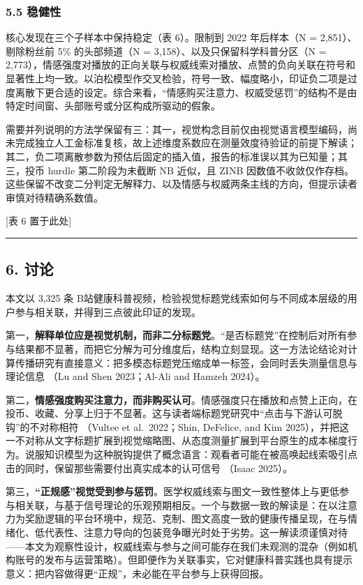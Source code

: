 \documentclass[
  fontset=none]{ctexart}
\begin{document}
\subsubsection{5.5 稳健性}\label{ux7a33ux5065ux6027}

核心发现在三个子样本中保持稳定（表 6）。限制到 2022 年后样本（N = 2{,}851）、剔除粉丝前 5\% 的头部频道（N = 3{,}158）、以及只保留科学科普分区（N = 2{,}773），情感强度对播放的正向关联与权威线索对播放、点赞的负向关联在符号和显著性上均一致。以泊松模型作交叉检验，符号一致、幅度略小，印证负二项是过度离散下更合适的设定。综合来看，``情感购买注意力、权威受惩罚''的结构不是由特定时间窗、头部账号或分区构成所驱动的假象。

需要并列说明的方法学保留有三：其一，视觉构念目前仅由视觉语言模型编码，尚未完成独立人工金标准复核，故上述维度系数应在测量效度待验证的前提下解读；其二，负二项离散参数为预估后固定的插入值，报告的标准误以其为已知量；其三，投币 hurdle 第二阶段为未截断 NB 近似，且 ZINB 因数值不收敛仅作存档。这些保留不改变二分判定无解释力、以及情感与权威两条主线的方向，但提示读者审慎对待精确系数值。

{[}表 6 置于此处{]}

\begin{center}\rule{0.5\linewidth}{0.5pt}\end{center}

\subsection{6. 讨论}\label{ux8ba8ux8bba}

本文以 3{,}325 条 B站健康科普视频，检验视觉标题党线索如何与不同成本层级的用户参与相关联，并得到三点彼此印证的发现。

第一，\textbf{解释单位应是视觉机制，而非二分标题党}。``是否标题党''在控制后对所有参与结果都不显著，而把它分解为可分维度后，结构立刻显现。这一方法论结论对计算传播研究有直接意义：把多模态标题党压缩成单一标签，会同时丢失测量信息与理论信息 （Lu and Shen 2023；Al-Ali and Hamzeh 2024）。

第二，\textbf{情感强度购买注意力，而非购买认可}。情感强度只在播放和点赞上正向，在投币、收藏、分享上归于不显著。这与读者端标题党研究中``点击与下游认可脱钩''的不对称相符 （Vultee et al.~2022；Shin, DeFelice, and Kim 2025），并把这一不对称从文字标题扩展到视觉缩略图、从态度测量扩展到平台原生的成本梯度行为。说服知识模型为这种脱钩提供了概念语言：观看者可能在被高唤起线索吸引点击的同时，保留那些需要付出真实成本的认可信号 （Isaac 2025）。

第三，\textbf{``正规感''视觉受到参与惩罚}。医学权威线索与图文一致性整体上与更低参与相关联，与基于信号理论的乐观预期相反。一个与数据一致的解读是：在以注意力为奖励逻辑的平台环境中，规范、克制、图文高度一致的健康传播呈现，在与情绪化、低代表性、注意力导向的包装竞争曝光时处于劣势。这一解读须谨慎对待——本文为观察性设计，权威线索与参与之间可能存在我们未观测的混杂（例如机构账号的发布与运营策略）。但即便作为关联事实，它对健康科普实践也具有提示意义：把内容做得更``正规''，未必能在平台参与上获得回报。
\end{document}

